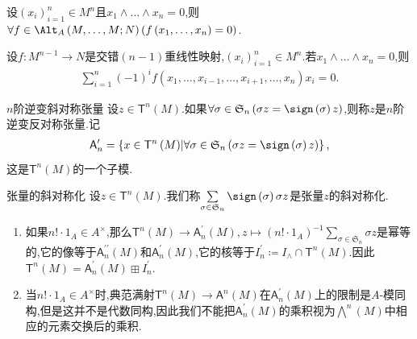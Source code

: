 \begin{corollary}{}{}
	设$\left(x_{i}\right)_{i=1}^{n}\in M^{n}$且$x_{1}\wedge\ldots\wedge x_{n}=0$,则$\forall f\in\Alt_{A}\left(M,\ldots,M;N\right)\left(f\left(x_{1},\ldots,x_{n}\right)=0\right)$.
\end{corollary}

\begin{proposition}{}{}
	设$f:M^{n-1}\to N$是交错$\left(n-1\right)$重线性映射,$\left(x_{i}\right)_{i=1}^{n}\in M^{n}$.若$x_{1}\wedge\ldots\wedge x_{n}=0$,则
	\begin{align*}
		\sum\limits_{i=1}^{n}\left(-1\right)^{i}f\left(x_{1},\ldots,x_{i-1},\ldots,x_{i+1},\ldots,x_{n}\right)x_{i}=0.
	\end{align*}
\end{proposition}

\begin{definition}{$n$阶逆变斜对称张量}{}
	设$z\in\mathsf{T}^{n}\left(M\right)$.如果$\forall\sigma\in\mathfrak{S}_{n}\left(\sigma z=\sign\left(\sigma\right)z\right)$,则称$z$是$n$阶逆变反对称张量.记
	\begin{align*}
		\mathsf{A}_{n}^{\prime}=\left\{x\in\mathsf{T}^{n}\left(M\right)\middle|\forall\sigma\in\mathfrak{S}_{n}\left(\sigma z=\sign\left(\sigma\right)z\right)\right\},
	\end{align*}
	这是$\mathsf{T}^{n}\left(M\right)$的一个子模.
\end{definition}

\begin{definition}{张量的斜对称化}{}
	设$z\in\mathsf{T}^{n}\left(M\right)$.我们称$\sum\limits_{\sigma\in\mathfrak{S}_{n}}\sign\left(\sigma\right)\sigma z$是张量$z$的斜对称化.
\end{definition}

\begin{remark}{}{}
	\begin{enumerate}
		\item 如果$n!\cdot 1_{A}\in A^{\times}$,那么$\mathsf{T}^{n}\left(M\right)\to\mathsf{A}_{n}^{\prime}\left(M\right),z\mapsto\left(n!\cdot 1_{A}\right)^{-1}\sum\limits_{\sigma\in\mathfrak{S}_{n}}\sigma z$是幂等的,它的像等于$\mathsf{A}_{n}^{\prime\prime}\left(M\right)$和$\mathsf{A}_{n}^{\prime}\left(M\right)$,它的核等于$I_{n}^{\prime}\coloneq I_{\wedge}\cap\mathsf{T}^{n}\left(M\right)$.因此$\mathsf{T}^{n}\left(M\right)=\mathsf{A}_{n}^{\prime}\left(M\right)\boxplus I_{n}^{\prime}$.
		\item 当$n!\cdot 1_{A}\in A^{\times}$时,典范满射$\mathsf{T}^{n}\left(M\right)\to\mathsf{A}^{n}\left(M\right)$在$\mathsf{A}_{n}^{\prime}\left(M\right)$上的限制是$A$-模同构,但是这并不是代数同构,因此我们不能把$\mathsf{A}_{n}^{\prime}\left(M\right)$的乘积视为$\bigwedge\limits^{n}\left(M\right)$中相应的元素交换后的乘积.
	\end{enumerate}
\end{remark}
